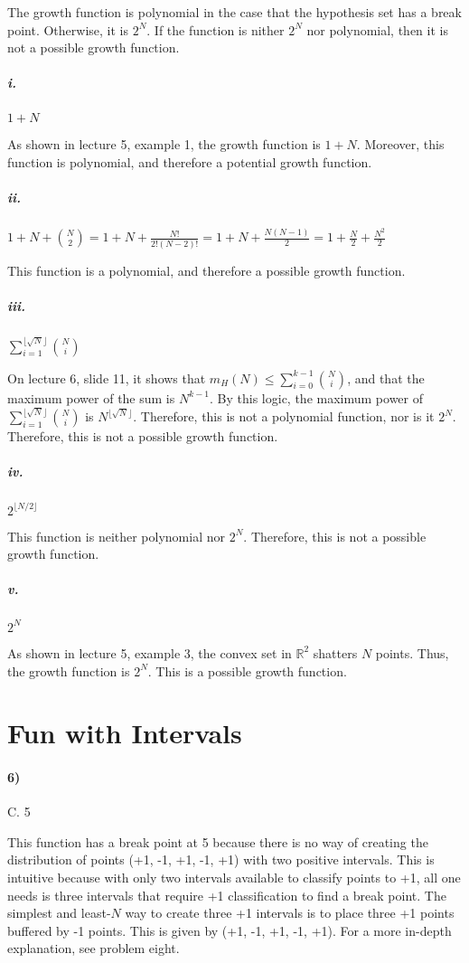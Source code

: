 \documentclass[10pt,letter]{article}
\begin{document}
	The growth function is polynomial in the case that the hypothesis set has a break point. Otherwise, it is $2^N$. If the function is nither $2^N$ nor polynomial, then it is not a possible growth function.

	\subparagraph{i.} $1 + N$

		As shown in lecture 5, example 1, the growth function is $1 + N$. Moreover, this function is polynomial, and therefore a potential growth function.

	\subparagraph{ii.} $1 + N + \binom{N}{2} = 1 + N + \frac{N!}{2!(N - 2)!} = 1 + N + \frac{N(N-1)}{2} = 1 + \frac{N}{2} + \frac{N^2}{2}$

		This function is a polynomial, and therefore a possible growth function.

	\subparagraph{iii.} $\sum_{i=1}^{\lfloor{\sqrt N} \rfloor} \binom{N}{i}$

		On lecture 6, slide 11, it shows that $m_H(N) \leq \sum_{i=0}^{k-1}\binom{N}{i}$, and that the maximum power of the sum is $N^{k-1}$. By this logic, the maximum power of $\sum_{i=1}^{\lfloor{\sqrt N} \rfloor} \binom{N}{i}$ is $N^{\lfloor{\sqrt N} \rfloor}$. Therefore, this is not a polynomial function, nor is it $2^N$. Therefore, this is not a possible growth function.

	\subparagraph{iv.} $2^{\lfloor{N/2}\rfloor}$

		This function is neither polynomial nor $2^N$. Therefore, this is not a possible growth function.

	\subparagraph{v.} $2^N$

		As shown in lecture 5, example 3, the convex set in $\mathbb R^2$ shatters $N$ points. Thus, the growth function is $2^N$. This is a possible growth function.

\section*{Fun with Intervals}

\paragraph{6)} C. 5

	This function has a break point at 5 because there is no way of creating the distribution of points (+1, -1, +1, -1, +1) with two positive intervals. This is intuitive because with only two intervals available to classify points to +1, all one needs is three intervals that require +1 classification to find a break point. The simplest and least-$N$ way to create three +1 intervals is to place three +1 points buffered by -1 points. This is given by (+1, -1, +1, -1, +1). For a more in-depth explanation, see problem eight.
\end{document}
